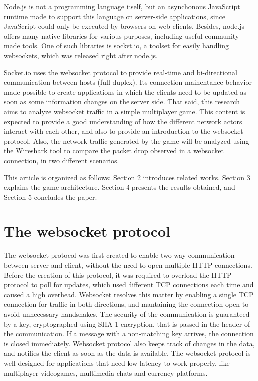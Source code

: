 \documentclass[english]{sbrt}
\begin{document}
Node.js is not a programming language itself, but an asynchonous JavaScript runtime made to support this language on server-side applications, since JavaScript could
only be executed by browsers on web clients. Besides, node.js offers many native libraries for various purposes, including useful community-made tools. One of such libraries is socket.io, a toolset for easily handling websockets, which was released right after node.js.

Socket.io uses the websocket protocol to provide real-time and bi-directional communication between hosts (full-duplex). Its connection mainentance behavior made possible to create applications in which the clients need to be updated as soon as some information changes on the server side. That said, this research aims to analyze websocket traffic in a simple multiplayer game. This content is expected to provide a good understanding of how the different network
actors interact with each other, and also to provide an introduction to the websocket protocol. Also, the network traffic generated by the game will be analyzed
using the Wireshark tool to compare the packet drop observed in a websocket connection, in two different scenarios.

This article is organized as follows: Section 2 introduces related works. Section 3 explains the game architecture. Section 4 presents the results obtained, and Section 5 concludes the paper.

\section{\textbf{The websocket protocol}}
The websocket protocol was first created to enable two-way communication between server and client, without the need to open multiple HTTP connections. Before the creation of this protocol, it was required to overload the HTTP protocol to poll for updates, which used different TCP connections each time and caused a high overhead. Websocket resolves this matter by enabling a single TCP connection for traffic in both directions, and mantaining the connection open to avoid unnecessary handshakes. The security of the communication is guaranteed by a key, cryptographed using SHA-1 encryption, that is passed in the header of the communication. If a message with a non-matching key arrives, the connection is closed immediately. Websocket protocol also keeps track of changes in the data, and notifies the client as soon as the data is available. The websocket protocol is well-designed for applications that need low latency to work properly, like multiplayer videogames, multimedia chats and currency platforms.
\end{document}
